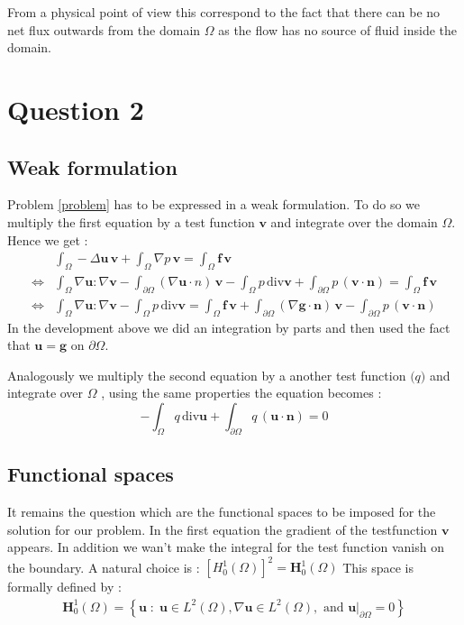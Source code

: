 \documentclass{article}
\begin{document}
From a physical point of view this correspond to the fact that there can be no
net flux outwards from the domain $\Omega$ as the flow has no source of fluid
inside the domain.

\section*{Question 2}
\subsection*{Weak formulation}
Problem \ref{problem} has to be expressed in a weak formulation. To do so we
multiply the first equation by a test function $\mathbf{v}$ and integrate over
the domain $\Omega$. Hence we get :
\begin{align*}
	& \int_{\Omega}-\Delta \mathbf{u} \,\mathbf{v}+\int_{\Omega}\nabla p \,\mathbf{v} = \int_{\Omega}\mathbf{f}\, \mathbf{v} \\
	\Leftrightarrow& \int_{\Omega} \nabla \mathbf{u} \mathbf{:} \nabla \mathbf{v}-\int_{\partial\Omega} (\nabla \mathbf{u}\cdot n)\, \mathbf{v}  -\int_{\Omega} p\, \mathrm{div}\mathbf{v}+\int_{\partial\Omega}p\,(\mathbf{v}\cdot \mathbf{n})=\int_{\Omega}\mathbf{f}\, \mathbf{v} \\
	\Leftrightarrow& \int_{\Omega} \nabla \mathbf{u} \mathbf{:} \nabla \mathbf{v}-\int_{\Omega} p\, \mathrm{div}\mathbf{v}=\int_{\Omega}\mathbf{f}\, \mathbf{v}+\int_{\partial\Omega} (\nabla \mathbf{g}\cdot \mathbf{n})\, \mathbf{v}-\int_{\partial\Omega}p\,(\mathbf{v}\cdot \mathbf{n})   
\end{align*}
In the development above we did an integration by parts and then used the fact
that $\mathbf{u}=\mathbf{g} \textrm{ on } \partial\Omega$.

Analogously we multiply the second equation by a another test function
$\mathbf(q)$ and integrate over $\Omega$ , using the same properties the
equation becomes :
\begin{equation*}
    -\int_{\Omega} q\, \mathrm{div}\mathbf{u}+\int_{\partial\Omega}q\,(\mathbf{u}\cdot \mathbf{n})=0
\end{equation*}

\subsection*{Functional spaces}
It remains the question which are the functional spaces to be imposed for the
solution for our problem. In the first equation the gradient of the
testfunction $\mathbf{v}$ appears. In addition we wan't make the integral for
the test function vanish on the boundary. A natural choice is :
$[H^1_0(\Omega)]^2 = \mathbf{H}^1_0(\Omega)$
This space is formally defined by :  
\begin{align*}
	\mathbf{H}^1_0(\Omega) = \left\{\mathbf{u} \;:\; \mathbf{u} \in L^2(\Omega),
	\nabla \mathbf{u} \in L^2(\Omega), \textrm{ and }
	\mathbf{u}|_{\partial\Omega}=0 \right\}
\end{align*}
\end{document}
